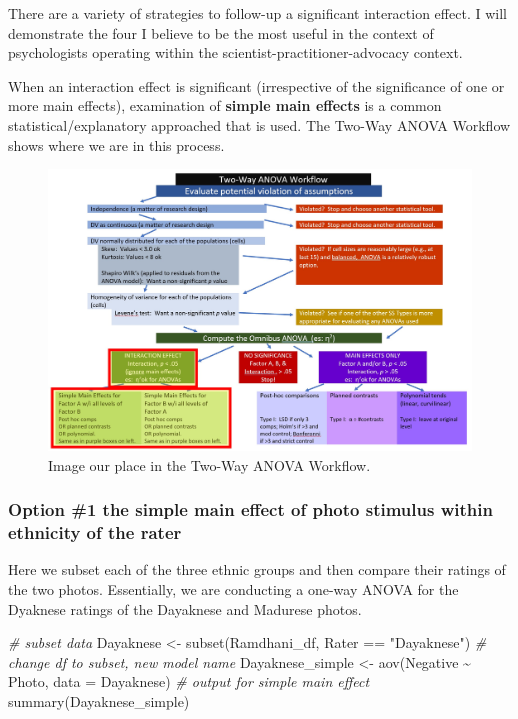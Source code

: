 \documentclass[
  11pt,
]{book}
\newenvironment{Shaded}{\begin{snugshade}}{\end{snugshade}}
\newcommand{\AttributeTok}[1]{\textcolor[rgb]{0.77,0.63,0.00}{#1}}
\newcommand{\CommentTok}[1]{\textcolor[rgb]{0.56,0.35,0.01}{\textit{#1}}}
\newcommand{\FunctionTok}[1]{\textcolor[rgb]{0.00,0.00,0.00}{#1}}
\newcommand{\NormalTok}[1]{#1}
\newcommand{\OtherTok}[1]{\textcolor[rgb]{0.56,0.35,0.01}{#1}}
\newcommand{\SpecialCharTok}[1]{\textcolor[rgb]{0.00,0.00,0.00}{#1}}
\newcommand{\StringTok}[1]{\textcolor[rgb]{0.31,0.60,0.02}{#1}}
\begin{document}
There are a variety of strategies to follow-up a significant interaction effect. I will demonstrate the four I believe to be the most useful in the context of psychologists operating within the scientist-practitioner-advocacy context.

When an interaction effect is significant (irrespective of the significance of one or more main effects), examination of \textbf{simple main effects} is a common statistical/explanatory approached that is used. The Two-Way ANOVA Workflow shows where we are in this process.

\begin{figure}
\centering
\includegraphics{images/factorial/WrkFlo_IntSmp.jpg}
\caption{Image our place in the Two-Way ANOVA Workflow.}
\end{figure}

\hypertarget{option-1-the-simple-main-effect-of-photo-stimulus-within-ethnicity-of-the-rater}{%
\subsubsection{Option \#1 the simple main effect of photo stimulus within ethnicity of the rater}\label{option-1-the-simple-main-effect-of-photo-stimulus-within-ethnicity-of-the-rater}}

Here we subset each of the three ethnic groups and then compare their ratings of the two photos. Essentially, we are conducting a one-way ANOVA for the Dyaknese ratings of the Dayaknese and Madurese photos.

\begin{Shaded}
\begin{Highlighting}[]
\CommentTok{\# subset data}
\NormalTok{Dayaknese }\OtherTok{\textless{}{-}} \FunctionTok{subset}\NormalTok{(Ramdhani\_df, Rater }\SpecialCharTok{==} \StringTok{"Dayaknese"}\NormalTok{)}
\CommentTok{\# change df to subset, new model name}
\NormalTok{Dayaknese\_simple }\OtherTok{\textless{}{-}} \FunctionTok{aov}\NormalTok{(Negative }\SpecialCharTok{\textasciitilde{}}\NormalTok{ Photo, }\AttributeTok{data =}\NormalTok{ Dayaknese)}
\CommentTok{\# output for simple main effect}
\FunctionTok{summary}\NormalTok{(Dayaknese\_simple)}
\end{Highlighting}
\end{Shaded}
\end{document}
